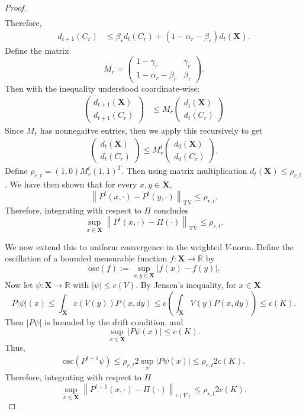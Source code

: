 \documentclass[10pt,a4paper]{amsart}
\newcommand{\R}{\mathbb{R}}
\newcommand{\X}{\textbf{X}}
\newcommand{\norm}[1]{\left\lVert#1\right\rVert}
\renewcommand{\P}{P}
\begin{document}
\begin{proof}
\begin{align*}
\end{align*}
Therefore,
\begin{align*}
d_{t+1}(C_r) &\le \beta_r d_{t}(C_r) + \left( 1 - \alpha_r - \beta_r \right) d_{t}(\X).
\end{align*}
Define the matrix 
\[
M_r = \begin{pmatrix}
1 - \gamma_r & \gamma_r \\
1 - \alpha_r - \beta_r  & \beta_r
\end{pmatrix}.
\]
Then with the inequality understood coordinate-wise:
\begin{align*}
\begin{pmatrix}
d_{t+1}(\X) \\
d_{t+1}(C_r)
\end{pmatrix}
&\le M_r \begin{pmatrix}
d_{t}(\X) \\
d_{t}(C_r)
\end{pmatrix}
\end{align*}
Since $M_r$ has nonnegaitve entries, then we apply this recursively to get
\begin{align*}
\begin{pmatrix}
d_{t}(\X) \\
d_{t}(C_r)
\end{pmatrix}
\le M_r^{t} \begin{pmatrix}
d_{0}(\X) \\
d_{0}(C_r)
\end{pmatrix}.
\end{align*}
Define $\rho_{r, t} = (1, 0) M_r^t (1, 1)^T$.
Then using matrix multiplication $d_{t}(\X) \le \rho_{r, t}$.
We have then shown that for every $x, y \in \X$,
\[
\norm{\P^t(x, \cdot) - \P^t(y, \cdot)}_{\text{TV}}
\le \rho_{r, t}.
\]
Therefore, integrating with respect to $\Pi$ concludes
\[
\sup_{x \in \X} \norm{\P^t(x, \cdot) - \Pi(\cdot)}_{\text{TV}}
\le \rho_{r, t}.
\]

We now extend this to uniform convergence in the weighted $V$-norm. 
Define the oscillation of a bounded measurable function $f : \X \to \R$ by
\[
\text{osc}(f) := \sup_{x,y \in \X} |f(x) - f(y)|.
\]
Now let $\psi : \X \to \R$ with $|\psi| \le c(V)$. 
By Jensen's inequality, for $x \in \X$
\[
\P |\psi|(x) 
\le \int_{\X} c(V(y)) \P(x, dy)
\le c\left( \int_{\X} V(y) \P(x, dy) \right)
\le c( K ).
\]
Then $| P\psi |$ is bounded by the drift condition, and
\[
\sup_{x \in \X} |P\psi(x)| \le c( K ).
\]
Thus,
\begin{align*}
\text{osc}(P^{t+1}\psi)
\le \rho_{r, t}  2 \sup_{x} |P\psi(x)|
\le \rho_{r, t}  2 c(K).
\end{align*}
Therefore, integrating with respect to $\Pi$
\[
\sup_{x \in \X} \norm{\P^{t + 1}(x, \cdot) - \Pi(\cdot)}_{c(V)}
\le \rho_{r, t} 2 c(K).
\]


\end{proof}
\end{document}
